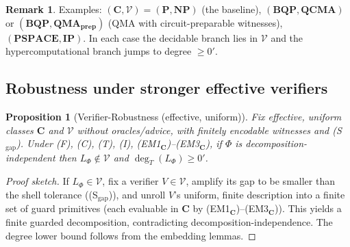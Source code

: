 \documentclass[12pt]{article}
\theoremstyle{definition}
\newtheorem{remark}{Remark}[section]
\theoremstyle{plain}
\newtheorem{proposition}{Proposition}[section]
\begin{document}
\begin{remark}
Examples: $(\mathbf C,\mathcal V)=(\mathbf P,\mathbf{NP})$ (the baseline), $(\mathbf{BQP},\mathbf{QCMA})$ or $(\mathbf{BQP},\mathbf{QMA_{prep}})$ (QMA with circuit-preparable witnesses), $(\mathbf{PSPACE},\mathbf{IP})$. In each case the decidable branch lies in $\mathcal V$ and the hypercomputational branch jumps to degree $\ge 0'$.
\end{remark}

\subsection{Robustness under stronger effective verifiers}\label{subsec:robustness}

\begin{proposition}[Verifier-Robustness (effective, uniform)]\label{prop:verifier-robustness}
Fix effective, uniform classes $\mathbf C$ and $\mathcal V$ without oracles/advice, with finitely encodable witnesses and \textup{(S$_{\mathrm{gap}}$)}. Under \textup{(F)}, \textup{(C)}, \textup{(T)}, \textup{(I)}, \textup{(EM1$_{\mathbf C}$)}–\textup{(EM3$_{\mathbf C}$)}, if $\Phi$ is decomposition-independent then $L_\Phi\notin\mathcal V$ and $\deg_T(L_\Phi)\ge 0'$.
\end{proposition}

\begin{proof}[Proof sketch]
If $L_\Phi\in\mathcal V$, fix a verifier $V\in\mathcal V$, amplify its gap to be smaller than the shell tolerance (\textup{(S$_{\mathrm{gap}}$)}), and unroll $V$’s uniform, finite description into a finite set of guard primitives (each evaluable in $\mathbf C$ by \textup{(EM1$_{\mathbf C}$)}–\textup{(EM3$_{\mathbf C}$)}). This yields a finite guarded decomposition, contradicting decomposition-independence. The degree lower bound follows from the embedding lemmas.
\end{proof}
\end{document}

